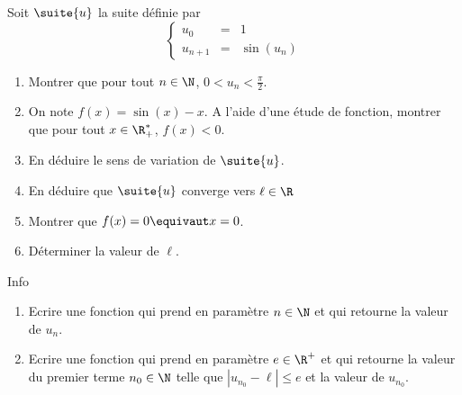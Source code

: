 \documentclass[a4paper, 11pt,reqno]{article}
\begin{document}
\begin{exercice}
Soit $\suite{u}$ la suite définie par 
$$\left\{ 
\begin{array}{ccl}
u_0&=&1\\
u_{n+1} &=& \sin(u_n)
\end{array}
\right.$$

\begin{enumerate}
\item Montrer que pour tout $n\in \N$, $0<u_n<\frac{\pi}{2}$.
\item On note $f(x) = \sin(x)-x$.  A l'aide d'une étude de fonction, montrer que pour tout $x\in \R_+^*$, $f(x)<0.$
\item En déduire le sens de variation de $\suite{u}$.
\item En déduire que $\suite{u}$ converge vers $\ell \in \R$
\item  Montrer que $f(x)=0 \equivaut x=0$.
\item Déterminer la valeur de $\ell$. 
\end{enumerate}

Info 
\begin{enumerate}
\item Ecrire une fonction qui prend en paramètre $n\in \N$ et qui retourne la valeur de $u_n$. 
\item 
Ecrire une fonction qui prend en paramètre $e\in \R^+$ et qui retourne la valeur du premier terme $n_0\in \N$ telle que $|u_{n_0}-\ell| \leq e$ et la valeur de $u_{n_0}$.
\end{enumerate}

\end{exercice}
\end{document}
